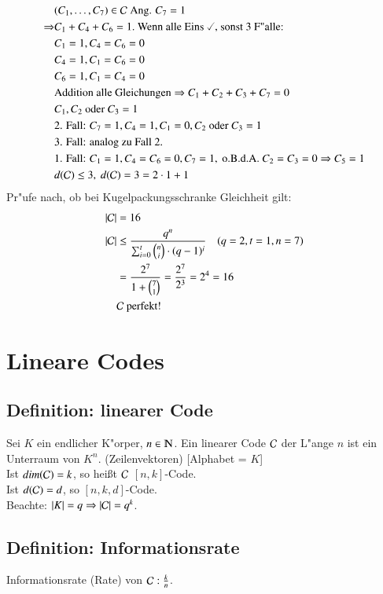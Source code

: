 \begin{align*}
	&(C_1,\ldots,C_7) \in \Code \text{ Ang. } C_7=1 \\
	\Rightarrow &C_1+C_4+C_6=1. \text{ Wenn alle Eins } \checked \text{, sonst 3 F"alle:} \\
	&C_1=1,C_4=C_6=0\\
	&C_4=1,C_1=C_6=0\\
	&C_6=1,C_1=C_4=0\\
	&\text{Addition alle Gleichungen} \Rightarrow C_1+C_2+C_3+C_7=0\\
	&C_1, C_2\text{ oder } C_3 = 1 \\
	&\text{2. Fall: } C_7=1,C_4=1,C_1=0,C_2 \text{ oder } C_3=1 \\
	&\text{3. Fall: analog zu Fall 2.}\\
	&\text{1. Fall: } C_1=1,C_4=C_6=0, C_7=1, \text{ o.B.d.A. } C_2=C_3=0 \Rightarrow C_5=1\\
	&d(\Code) \leq 3,\ d(\Code)=3=2 \cdot 1 + 1
\end{align*}
Pr"ufe nach, ob bei Kugelpackungsschranke Gleichheit gilt:
\begin{align*}
	\left|\mathcal{C}\right| &=16\\
	\left|\mathcal{C}\right| &\leq \frac{q^n}{\sum_{i=0}^t \binom{n}{i} \cdot (q-1)^i} \quad (q=2, t=1, n=7)\\
	&=\frac{2^7}{1+\binom{7}{1}}=\frac{2^7}{2^3}=2^4=16\\
	&\mathcal{C}\text{ perfekt!}
\end{align*}

\section{Lineare Codes}
\subsection{Definition: linearer Code}
Sei $K$ ein endlicher K"orper, $n \in \N$. Ein linearer Code $\mathcal{C}$ der L"ange $n$ ist ein Unterraum von $K^n$. (Zeilenvektoren) [Alphabet = $K$] \\
Ist $dim(\mathcal{C})=k$, so hei\ss t $\mathcal{C}$ $\left[n,k\right]$-Code.\\
Ist $d(\mathcal{C})=d$, so $\left[ n,k,d \right]$-Code. \\
Beachte: $\left| K \right| = q \Rightarrow \left| \mathcal{C} \right| =q^k$.\\
\subsection{Definition: Informationsrate}
Informationsrate (Rate) von $\mathcal{C}: \frac{k}{n}$.\\
